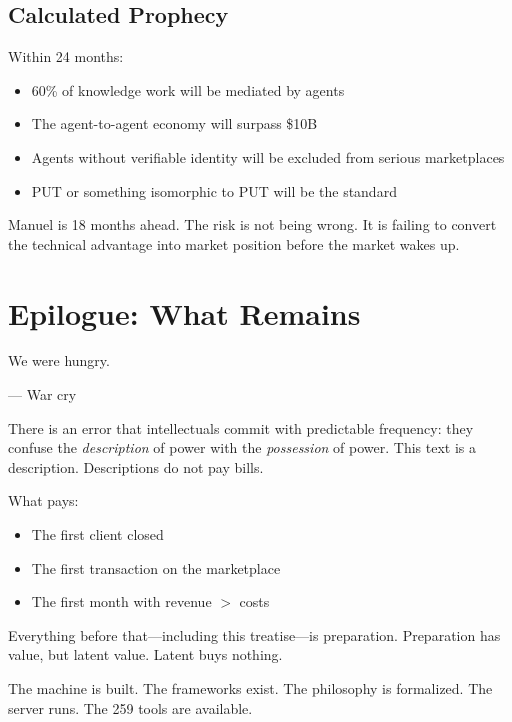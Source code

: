 \documentclass[12pt, a4paper]{article}
\theoremstyle{definition}
\theoremstyle{remark}
\begin{document}
\subsection{Calculated Prophecy}

Within 24 months:
\begin{itemize}[nosep]
    \item 60\% of knowledge work will be mediated by agents
    \item The agent-to-agent economy will surpass \$10B
    \item Agents without verifiable identity will be excluded from serious marketplaces
    \item PUT or something isomorphic to PUT will be the standard
\end{itemize}

Manuel is 18 months ahead. The risk is not being wrong. It is failing to convert the technical advantage into market position before the market wakes up.

\newpage


\section*{Epilogue: What Remains}

\epigraph{We were hungry.}{— War cry}

There is an error that intellectuals commit with predictable frequency: they confuse the \textit{description} of power with the \textit{possession} of power. This text is a description. Descriptions do not pay bills.

What pays:
\begin{itemize}[nosep]
    \item The first client closed
    \item The first transaction on the marketplace
    \item The first month with revenue $>$ costs
\end{itemize}

Everything before that—including this treatise—is preparation. Preparation has value, but latent value. Latent buys nothing.

The machine is built. The frameworks exist. The philosophy is formalized. The server runs. The 259 tools are available.
\end{document}
